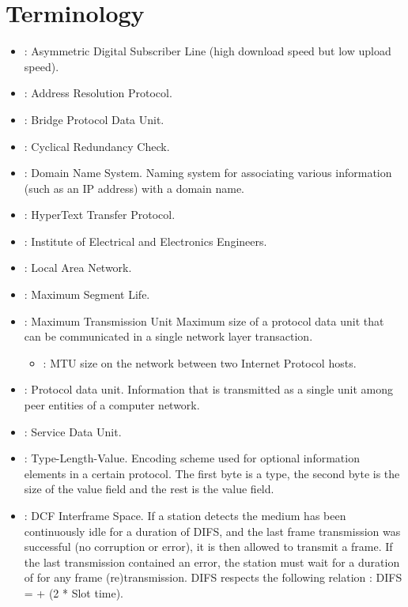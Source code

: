 \chapter{Terminology} %

\begin{itemize}
\item {} : Asymmetric Digital Subscriber Line (high download speed but low upload speed).
\item {} : Address Resolution Protocol.
\item {} : Bridge Protocol Data Unit.
\item {} : Cyclical Redundancy Check.
\item {} : Domain Name System. Naming system for associating various information (such as an IP address) with a domain name.
\item {} : HyperText Transfer Protocol.
\item {} : Institute of Electrical and Electronics Engineers.
\item {} : Local Area Network.
\item {} : Maximum Segment Life.
\item {} : Maximum Transmission Unit Maximum size of a protocol data unit that can be communicated in a single network layer transaction.
	\begin{itemize}
	\item {} : MTU size on the network between two Internet Protocol hosts.
	\end{itemize}
\item {} : Protocol data unit. Information that is transmitted as a single unit among peer entities of a computer network.
\item {} : Service Data Unit.
\item {} : Type-Length-Value. Encoding scheme used for optional information elements in a certain protocol. The first byte is a type, the second byte is the size of the value field and the rest is the value field.
\item {} : DCF Interframe Space. If a station detects the medium has been continuously idle for a duration of DIFS, and the last frame transmission was successful (no corruption or error), it is then allowed to transmit a frame. If the last transmission contained an error, the station must wait for a duration of  for any frame (re)transmission. DIFS respects the following relation : DIFS =  + (2 * Slot time).

\end{itemize}
